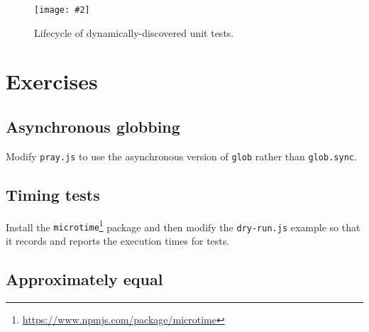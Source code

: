 \documentclass[krantzl]{krantz}
\newcommand{\figpdf}[4]{\begin{figure}%
\centering%
\texttt{[image: \#2]}%
\caption{#3}%
\label{#1}%
\end{figure}}
\newcommand{\hreffoot}[2]{{#1}\footnote{\href{#2}{#2}}}
\begin{document}
\figpdf{unit-test-lifecycle}{./unit-test/lifecycle.pdf}{Lifecycle of dynamically-discovered unit tests.}{0.6}

\section{Exercises}\label{unit-test-exercises}

\subsection*{Asynchronous globbing}


Modify \texttt{pray.js} to use the asynchronous version of \texttt{glob} rather than \texttt{glob.sync}.

\subsection*{Timing tests}


Install the \hreffoot{\texttt{microtime}}{https://www.npmjs.com/package/microtime} package and then modify the \texttt{dry-run.js} example
so that it records and reports the execution times for tests.

\subsection*{Approximately equal}
\end{document}
